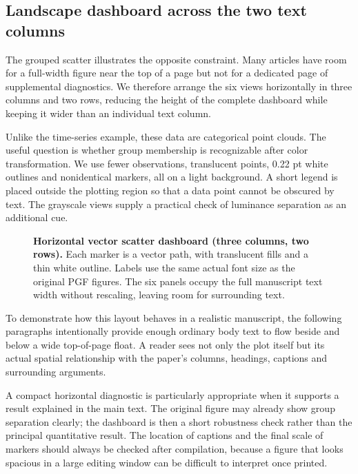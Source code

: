 \documentclass[10pt,twocolumn,a4paper]{article}
\begin{document}
\subsection{Landscape dashboard across the two text columns}
The grouped scatter illustrates the opposite constraint. Many articles
have room for a full-width figure near the top of a page but not for a
dedicated page of supplemental diagnostics. We therefore arrange the six
views horizontally in three columns and two rows, reducing the height
of the complete dashboard while keeping it wider than an individual
text column.

Unlike the time-series example, these data are categorical point clouds.
The useful question is whether group membership is recognizable after
color transformation. We use fewer observations, translucent points, 0.22 pt white
outlines and nonidentical markers, all on a light background. A short legend is placed
outside the plotting region so that a data point cannot be obscured by
text. The grayscale views supply a practical check of luminance separation
as an additional cue.

\begin{figure}[t]
  \centering
  
  \caption{\textbf{Horizontal vector scatter dashboard (three columns,
  two rows).} Each marker is a vector path, with translucent fills and
  a thin white outline. Labels use the same actual font size as the
  original PGF figures. The six panels occupy the full manuscript
  text width without rescaling, leaving room for surrounding text.}
  \label{fig:scatter-access}
\end{figure}

To demonstrate how this layout behaves in a realistic manuscript,
the following paragraphs intentionally provide enough ordinary body text
to flow beside and below a wide top-of-page float. A reader sees not only
the plot itself but its actual spatial relationship with the paper's
columns, headings, captions and surrounding arguments.

A compact horizontal diagnostic is particularly appropriate when it
supports a result explained in the main text. The original figure may
already show group separation clearly; the dashboard is then a short
robustness check rather than the principal quantitative result. The
location of captions and the final scale of markers should always be
checked after compilation, because a figure that looks spacious in a
large editing window can be difficult to interpret once printed.
\end{document}
